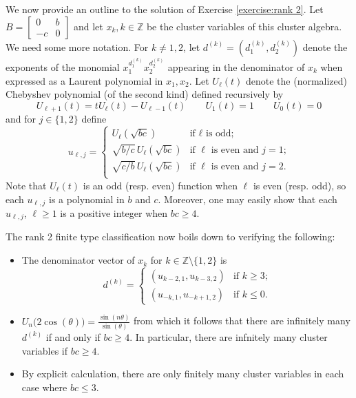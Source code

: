 \documentclass{amsart}
\theoremstyle{definition}
\theoremstyle{remark}
\numberwithin{equation}{section}
\newcommand{\ZZ}{{\mathbb{Z}}}
\begin{document}
		We now provide an outline to the solution of Exercise \ref{exercise:rank 2}.  Let $B=\left[\begin{array}{cc} 0 & b\\ -c & 0\end{array}\right]$ and let $x_k, k \in \mathbb{Z}$ be the cluster variables of this cluster algebra.  We need some more notation.  For $k \neq 1,2$, let $d^{(k)}=(d_1^{(k)},d_2^{(k)})$ denote the exponents of the monomial $x_1^{d^{(k)}_1}x_2^{d^{(k)}_2}$ appearing in the denominator of $x_k$ when expressed as a Laurent polynomial in $x_1, x_2$.  Let $U_\ell(t)$ denote the (normalized) Chebyshev polynomial (of the second kind) defined recursively by 
    \[U_{\ell+1}(t)=tU_\ell(t)-U_{\ell-1}(t)\qquad U_1(t)=1\qquad U_0(t)=0\]
    and for $j\in\{1,2\}$ define 
    \[u_{\ell,j}=\begin{cases}U_\ell(\sqrt{bc}) & \text{if $\ell$ is odd;}\\\sqrt{b/c}\,U_\ell(\sqrt{bc}) & \text{if $\ell$ is even and $j=1$;}\\\sqrt{c/b}\,U_\ell(\sqrt{bc}) & \text{if $\ell$ is even and $j=2$.}\\\end{cases}\]
    Note that $U_\ell(t)$ is an odd (resp. even) function when $\ell$ is even (resp. odd), so each $u_{\ell,j}$ is a polynomial in $b$ and $c$.  Moreover, one may easily show that each $u_{\ell,j}$, $\ell\ge1$ is a positive integer when $bc\ge4$.  
	
		The rank 2 finite type classification now boils down to verifying the following:
		\begin{itemize}
		\item The denominator vector of $x_k$ for $k\in\ZZ\setminus\{1,2\}$ is
    \begin{equation}\label{eq:rank 2 denominators}
      d^{(k)}=\begin{cases}(u_{k-2,1},u_{k-3,2}) & \text{if $k\ge3$;}\\(u_{-k,1},u_{-k+1,2}) & \text{if $k\le0$.}\end{cases}
    \end{equation}
    \item $U_n\big(2\cos(\theta)\big)=\frac{\sin(n\theta)}{\sin(\theta)}$ from which it follows that there are infinitely many $d^{(k)}$ if and only if $bc\ge4$.  In particular, there are infnitely many cluster variables if $bc \geq 4$.
		\item By explicit calculation, there are only finitely many cluster variables in each case where $bc \leq 3$.
    \end{itemize}
 
\end{document}
